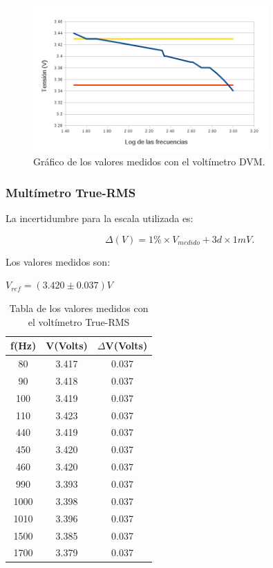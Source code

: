 \documentclass{article}
\begin{document}
\begin{figure}[!htb]
\centering
\includegraphics[width=0.80\textwidth]{images/tablaDVM.png}
\caption{Gráfico de los valores medidos con el voltímetro DVM.}
\end{figure}


\subsubsection{Multímetro True-RMS}

La incertidumbre para la escala utilizada es:

\begin{equation}
 	\Delta(V) = 1\%\times V_{medido} + 3d\times 1mV.
\end{equation}
\medskip

Los valores medidos son:

\begin{center}
$V_{ref} = (3.420 \pm 0.037) V$
\end{center}
\bigskip
\begin{table}[h]
	\begin{center}
	\begin{tabular}{|c|c|c|}\hline
	\textbf{f(Hz)} & \textbf{V(Volts)} & \textbf{$\Delta$V(Volts)} \\ \hline
	80 & 3.417 & 0.037\\ \hline
    90 & 3.418 & 0.037\\ \hline
    100 & 3.419 & 0.037\\ \hline
	110 & 3.423 & 0.037\\ \hline
	440 & 3.419 & 0.037\\ \hline
	450 & 3.420 & 0.037\\ \hline
	460 & 3.420 & 0.037\\ \hline
	990 & 3.393 & 0.037\\ \hline
	1000 & 3.398 & 0.037\\ \hline
	1010& 3.396 & 0.037\\ \hline
	1500 & 3.385 & 0.037\\ \hline
	1700 & 3.379 & 0.037\\ \hline
	\end{tabular}
	\caption{Tabla de los valores medidos con el voltímetro True-RMS}
	\end{center}
\end{table}
\bigskip
\end{document}

